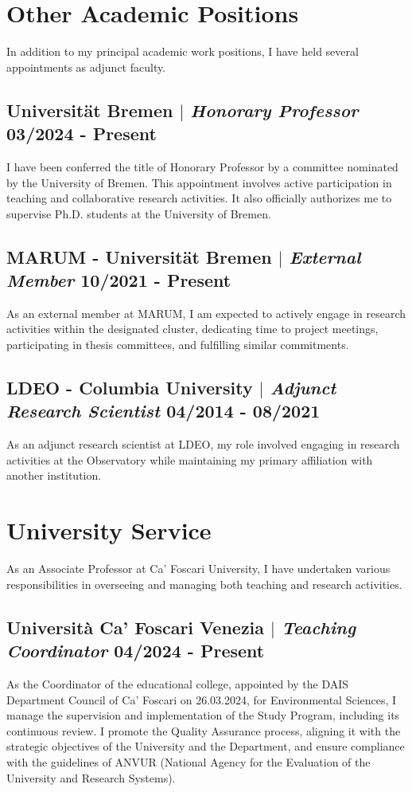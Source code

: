 \documentclass[11pt]{article}
\begin{document}
\section{Other Academic Positions}
{\normalfont In addition to my principal academic work positions, I have held several appointments as adjunct faculty.}\\
\bigskip

\subsection{Universität Bremen $|$ {\normalfont\textit{Honorary Professor}} \hfill 03/2024 - Present}
{\footnotesize I have been conferred the title of Honorary Professor by a committee nominated by the University of Bremen. This appointment involves active participation in teaching and collaborative research activities. It also officially authorizes me to supervise Ph.D. students at the University of Bremen.}
\bigskip

\subsection{MARUM - Universität Bremen $|$ {\normalfont\textit{External Member}} \hfill 10/2021 - Present}
{\footnotesize As an external member at MARUM, I am expected to actively engage in research activities within the designated cluster, dedicating time to project meetings, participating in thesis committees, and fulfilling similar commitments.}
\bigskip

\subsection{LDEO - Columbia University $|$ {\normalfont\textit{Adjunct Research Scientist}} \hfill 04/2014 - 08/2021}
{\footnotesize As an adjunct research scientist at LDEO, my role involved engaging in research activities at the Observatory while maintaining my primary affiliation with another institution.}

\section{University Service}
{\normalfont As an Associate Professor at Ca' Foscari University, I have undertaken various responsibilities in overseeing and managing both teaching and research activities.}\\
\bigskip
\subsection{Università Ca' Foscari Venezia  $|$ {\normalfont\textit{Teaching Coordinator}} \hfill 04/2024 - Present}
{\footnotesize As the Coordinator of the educational college, appointed by the DAIS Department Council of Ca' Foscari on 26.03.2024, for Environmental Sciences, I manage the supervision and implementation of the Study Program, including its continuous review. I promote the Quality Assurance process, aligning it with the strategic objectives of the University and the Department, and ensure compliance with the guidelines of ANVUR (National Agency for the Evaluation of the University and Research Systems).}
\end{document}
